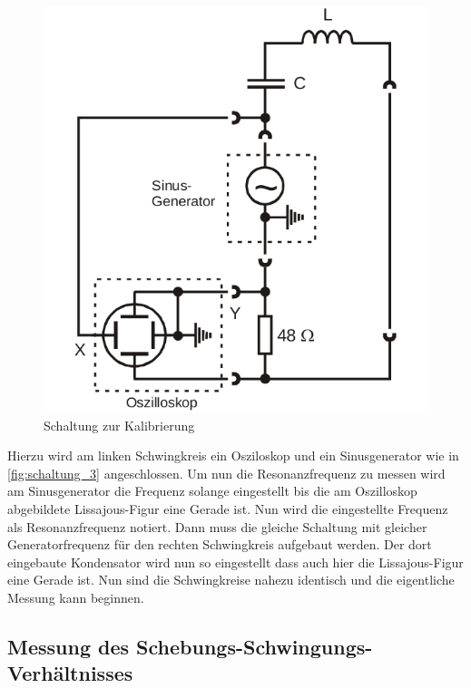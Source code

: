 \begin{figure}
    \centering
    \includegraphics[width=\textwidth/3]{images/schaltung_3.png}
    \caption{Schaltung zur Kalibrierung\cite{V355}}
    \label{fig:schaltung_3}
\end{figure}
Hierzu wird am linken Schwingkreis ein Osziloskop und ein Sinusgenerator wie in \autoref{fig:schaltung_3} angeschlossen. 
Um nun die Resonanzfrequenz zu messen wird am Sinusgenerator die Frequenz solange eingestellt bis die am Oszilloskop abgebildete Lissajous-Figur eine Gerade ist. Nun wird die eingestellte Frequenz als Resonanzfrequenz notiert.
Dann muss die gleiche Schaltung mit gleicher Generatorfrequenz für den rechten Schwingkreis aufgebaut werden.
Der dort eingebaute Kondensator wird nun so eingestellt dass auch hier die Lissajous-Figur eine Gerade ist. Nun sind die Schwingkreise nahezu identisch und die eigentliche Messung kann beginnen.

\subsection{Messung des Schebungs-Schwingungs-Verhältnisses}
\label{sec:schwebung}

